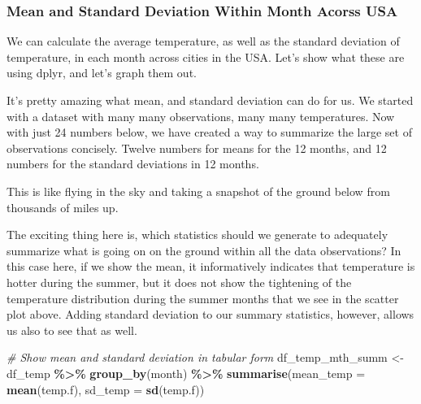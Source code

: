\documentclass[
]{book}
\newenvironment{Shaded}{\begin{snugshade}}{\end{snugshade}}
\newcommand{\CommentTok}[1]{\textcolor[rgb]{0.56,0.35,0.01}{\textit{#1}}}
\newcommand{\DataTypeTok}[1]{\textcolor[rgb]{0.13,0.29,0.53}{#1}}
\newcommand{\KeywordTok}[1]{\textcolor[rgb]{0.13,0.29,0.53}{\textbf{#1}}}
\newcommand{\NormalTok}[1]{#1}
\newcommand{\OperatorTok}[1]{\textcolor[rgb]{0.81,0.36,0.00}{\textbf{#1}}}
\newcommand{\StringTok}[1]{\textcolor[rgb]{0.31,0.60,0.02}{#1}}
\begin{document}
\hypertarget{mean-and-standard-deviation-within-month-acorss-usa}{%
\subsubsection{Mean and Standard Deviation Within Month Acorss USA}\label{mean-and-standard-deviation-within-month-acorss-usa}}

We can calculate the average temperature, as well as the standard deviation of temperature, in each month across cities in the USA. Let's show what these are using dplyr, and let's graph them out.

It's pretty amazing what mean, and standard deviation can do for us. We started with a dataset with many many observations, many many temperatures. Now with just 24 numbers below, we have created a way to summarize the large set of observations concisely. Twelve numbers for means for the 12 months, and 12 numbers for the standard deviations in 12 months.

This is like flying in the sky and taking a snapshot of the ground below from thousands of miles up.

The exciting thing here is, which statistics should we generate to adequately summarize what is going on on the ground within all the data observations? In this case here, if we show the mean, it informatively indicates that temperature is hotter during the summer, but it does not show the tightening of the temperature distribution during the summer months that we see in the scatter plot above. Adding standard deviation to our summary statistics, however, allows us also to see that as well.

\begin{Shaded}
\begin{Highlighting}[]
\CommentTok{\# Show mean and standard deviation in tabular form}
\NormalTok{df\_temp\_mth\_summ \textless{}{-}}\StringTok{ }\NormalTok{df\_temp }\OperatorTok{\%\textgreater{}\%}
\StringTok{    }\KeywordTok{group\_by}\NormalTok{(month) }\OperatorTok{\%\textgreater{}\%}
\StringTok{    }\KeywordTok{summarise}\NormalTok{(}\DataTypeTok{mean\_temp =} \KeywordTok{mean}\NormalTok{(temp.f), }\DataTypeTok{sd\_temp =} \KeywordTok{sd}\NormalTok{(temp.f))}
\end{Highlighting}
\end{Shaded}
\end{document}
